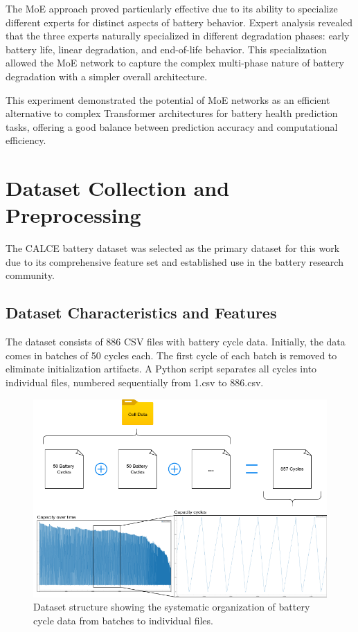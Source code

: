 The MoE approach proved particularly effective due to its ability to specialize different experts for distinct aspects of battery behavior. Expert analysis revealed that the three experts naturally specialized in different degradation phases: early battery life, linear degradation, and end-of-life behavior. This specialization allowed the MoE network to capture the complex multi-phase nature of battery degradation with a simpler overall architecture.

This experiment demonstrated the potential of MoE networks as an efficient alternative to complex Transformer architectures for battery health prediction tasks, offering a good balance between prediction accuracy and computational efficiency.

\section{Dataset Collection and Preprocessing}
\label{sec:dataset_preprocessing}

The CALCE battery dataset was selected as the primary dataset for this work due to its comprehensive feature set and established use in the battery research community.

\subsection{Dataset Characteristics and Features}
\label{subsec:dataset_characteristics}

The dataset consists of 886 CSV files with battery cycle data. Initially, the data comes in batches of 50 cycles each. The first cycle of each batch is removed to eliminate initialization artifacts. A Python script separates all cycles into individual files, numbered sequentially from 1.csv to 886.csv.

\begin{figure}[htbp]
\centering
\includegraphics[width=1.0\textwidth]{imgs/cycles_files.png}
\caption{Dataset structure showing the systematic organization of battery cycle data from batches to individual files.}
\label{fig:dataset_structure}
\end{figure}

